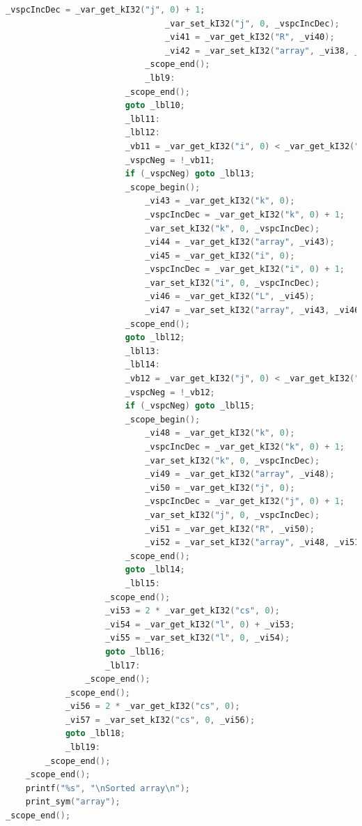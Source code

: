 \documentclass[a4paper]{article}
\begin{document}
\begin{lstlisting}[language=C]
                                _vspcIncDec = _var_get_kI32("j", 0) + 1;
                                _var_set_kI32("j", 0, _vspcIncDec);
                                _vi41 = _var_get_kI32("R", _vi40);
                                _vi42 = _var_set_kI32("array", _vi38, _vi41);
                            _scope_end();
                            _lbl9:
                        _scope_end();
                        goto _lbl10;
                        _lbl11:
                        _lbl12:
                        _vb11 = _var_get_kI32("i", 0) < _var_get_kI32("n1", 0);
                        _vspcNeg = !_vb11;
                        if (_vspcNeg) goto _lbl13;
                        _scope_begin();
                            _vi43 = _var_get_kI32("k", 0);
                            _vspcIncDec = _var_get_kI32("k", 0) + 1;
                            _var_set_kI32("k", 0, _vspcIncDec);
                            _vi44 = _var_get_kI32("array", _vi43);
                            _vi45 = _var_get_kI32("i", 0);
                            _vspcIncDec = _var_get_kI32("i", 0) + 1;
                            _var_set_kI32("i", 0, _vspcIncDec);
                            _vi46 = _var_get_kI32("L", _vi45);
                            _vi47 = _var_set_kI32("array", _vi43, _vi46);
                        _scope_end();
                        goto _lbl12;
                        _lbl13:
                        _lbl14:
                        _vb12 = _var_get_kI32("j", 0) < _var_get_kI32("n2", 0);
                        _vspcNeg = !_vb12;
                        if (_vspcNeg) goto _lbl15;
                        _scope_begin();
                            _vi48 = _var_get_kI32("k", 0);
                            _vspcIncDec = _var_get_kI32("k", 0) + 1;
                            _var_set_kI32("k", 0, _vspcIncDec);
                            _vi49 = _var_get_kI32("array", _vi48);
                            _vi50 = _var_get_kI32("j", 0);
                            _vspcIncDec = _var_get_kI32("j", 0) + 1;
                            _var_set_kI32("j", 0, _vspcIncDec);
                            _vi51 = _var_get_kI32("R", _vi50);
                            _vi52 = _var_set_kI32("array", _vi48, _vi51);
                        _scope_end();
                        goto _lbl14;
                        _lbl15:
                    _scope_end();
                    _vi53 = 2 * _var_get_kI32("cs", 0);
                    _vi54 = _var_get_kI32("l", 0) + _vi53;
                    _vi55 = _var_set_kI32("l", 0, _vi54);
                    goto _lbl16;
                    _lbl17:
                _scope_end();
            _scope_end();
            _vi56 = 2 * _var_get_kI32("cs", 0);
            _vi57 = _var_set_kI32("cs", 0, _vi56);
            goto _lbl18;
            _lbl19:
        _scope_end();
    _scope_end();
    printf("%s", "\nSorted array\n");
    print_sym("array");
_scope_end();
\end{lstlisting}

%

%
\end{document}
